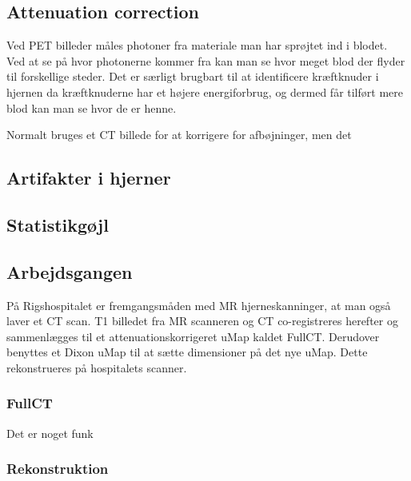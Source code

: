 \subsection{Attenuation correction}
Ved PET billeder måles photoner fra materiale man har sprøjtet ind i blodet. Ved
at se på hvor photonerne kommer fra kan man se hvor meget blod der flyder til
forskellige steder. Det er særligt brugbart til at identificere kræftknuder i
hjernen da kræftknuderne har et højere energiforbrug, og dermed får tilført
mere blod kan man se hvor de er henne.

Normalt bruges et CT billede for at korrigere for afbøjninger, men det  


\subsection{Artifakter i hjerner}


\subsection{Statistikgøjl}



\subsection{Arbejdsgangen}


På Rigshospitalet er fremgangsmåden med MR
hjerneskanninger, at man også laver et CT scan. T1 billedet fra MR scanneren
og CT co-registreres herefter og sammenlægges til et attenuationskorrigeret
uMap kaldet FullCT. Derudover benyttes et Dixon uMap til at sætte dimensioner
på det nye uMap. Dette rekonstrueres på hospitalets scanner.


\subsubsection{FullCT}


Det er noget funk

\subsubsection{Rekonstruktion}

